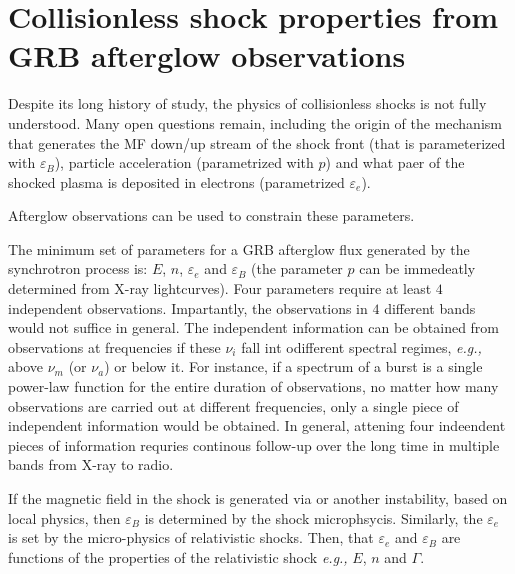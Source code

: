 
\section{Collisionless shock properties from GRB afterglow observations}

Despite its long history of study, the physics of collisionless shocks is not fully understood. Many open questions remain, including 
the origin of the mechanism that generates the MF down/up stream of the shock front (that is parameterized with $\varepsilon_B$), 
particle acceleration (parametrized with $p$)
and what paer of the shocked plasma is deposited in electrons (parametrized $\varepsilon_e$).

Afterglow observations can be used to constrain these parameters. 

The minimum set of parameters for a GRB afterglow flux generated by the synchrotron process is: 
$E$, $n$, $\varepsilon_e$ and $\varepsilon_B$ (the parameter $p$ can be immedeatly determined from X-ray lightcurves). 
Four parameters require at least $4$ independent observations. Impartantly, the observations in $4$ different bands would not suffice in general. The independent information can be obtained from observations at frequencies if these $\nu_i$ fall int odifferent spectral regimes, \textit{e.g.,} above $\nu_m$ (or $\nu_a$) or below it. 
For instance, if a spectrum of a burst is a single power-law function for the entire duration of observations, no matter how many observations are carried out at different frequencies, only a single piece of independent information would be obtained.
In general, attening four indeendent pieces of information requries continous follow-up over the long time in multiple bands from X-ray to radio.

If the magnetic field in the shock is generated via  \cite{(Weibel, 1959; Medvedev and Loeb, 1999)} or another instability, based on local physics, then $\varepsilon_B$ is determined by the shock microphsycis. Similarly, the $\varepsilon_e$ is set by the micro-physics of relativistic shocks. 
Then,  that $\varepsilon_e$ and $\varepsilon_B$ are functions of the properties of the relativistic shock \textit{e.g.,} $E$, $n$ and $\Gamma$. 

